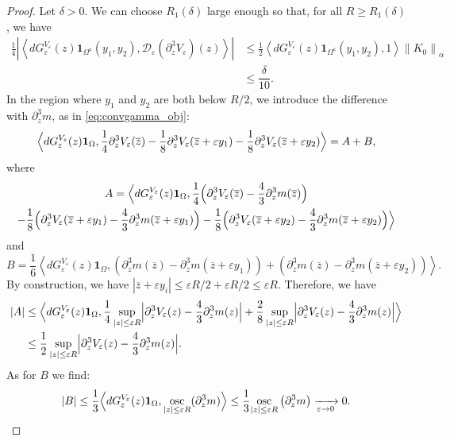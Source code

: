 \documentclass[10pt]{amsart}
\let\mathcal\mathscr
\theoremstyle{plain}
\theoremstyle{definition}
\newcommand{\comega}{\Omega^{\mathsf{c}}}
\newcommand{\D}{\mathcal{D}_\eps}
\let\eps\varepsilon
\newcommand{\abs}[1]{\left\lvert#1\right\rvert}
\newcommand{\Babs}[1]{\Bigl\lvert#1\Bigr\rvert}
\newcommand{\nalph}[1]{\left\lVert#1\right\rVert_\alpha}
\newcommand{\dQVe}{dG_\eps^{V_\eps}}
\newcommand{\bz}{\overline{z}}
\begin{document}
\begin{proof}
Let $\delta>0$. We can choose $R_1(\delta)$ large enough so that, for all $R\geq R_1(\delta)$, we have
\begin{equation*}
\begin{split}
\frac14 \left |\left\langle \dQVe(z)\mathbf{1}_{\comega}(y_1,y_2), \D(\partial_z^3 V_\eps)(z) \right\rangle \right |
&\leq \frac12 \left\langle \dQVe(z)\mathbf{1}_{\comega}(y_1,y_2), 1 \right\rangle \nalph{K_0}\\
& \leq \dfrac{\delta}{10}.
\end{split}
\end{equation*}
In the region where $y_1$ and $y_2$ are both below $R/2$,
we introduce the difference with $\partial_z^3m$, as in \eqref{eq:convgamma_obj}:
\begin{equation*}
\Bigl\langle \dQVe(z) \mathbf{1}_{\Omega}, \dfrac{1}{4} \partial_z^3 V_\eps(\bz) -\dfrac{1}{8} \partial^3_z V_\eps(\bz+\eps y_1)-\dfrac{1}{8} \partial^3_z V_\eps(\bz+\eps y_2) \Bigr\rangle = A + B,
\end{equation*}
where
\begin{multline*}
A = \Bigl\langle \dQVe(z)\mathbf{1}_{\Omega}, \dfrac{1}{4} \Bigl(\partial_z^3 V_\eps(\bz)-\frac43 \partial_z^3 m(\bz) \Bigr) \\
-\dfrac{1}{8} \Bigl(\partial^3_z V_\eps(\bz+\eps y_1)-\frac43 \partial_z^3 m(\bz + \eps y_1) \Bigr)-\dfrac{1}{8} \Bigl(\partial^3_z V_\eps(\bz+\eps y_2) -\frac43 \partial_z^3 m(\bz +\eps y_2) \Bigr) \Bigr\rangle
\end{multline*}
and
\begin{equation*}
B = \frac16 \left\langle \dQVe(z)\mathbf{1}_{\Omega}, \left (\partial^3_z m(\bz) - \partial_z^3 m(\bz + \eps y_1)\right) +\left (\partial^3_z m(\bz) - \partial_z^3 m(\bz +\eps y_2) \right)\right\rangle.
\end{equation*}
By construction, we have $|\bz + \eps y_i| \leq \eps R/2 + \eps R/2 \leq \eps R$. Therefore, we have
\begin{align*}
\abs{A} & \leq \Bigl\langle \dQVe(z) \mathbf{1}_{\Omega}, \dfrac{1}{4} \sup_{\abs{z} \leq \eps R}\Babs{ \partial_z^3 V_\eps(z)- \frac43 \partial_z^3 m(z)} + \dfrac{2}{8} \sup_{\abs{z} \leq \eps R} \Babs{ \partial_z^3 V_\eps(z)- \frac43 \partial_z^3 m(z)} \Bigr\rangle \\
& \leq \dfrac{1}{2}\sup_{\abs{z} \leq \eps R} \Babs{ \partial_z^3 V_\eps(z)- \frac43 \partial_z^3 m(z)}.
\end{align*}
As for $B$ we find:
\begin{equation*}
\abs{B} \leq \dfrac13 \Bigl\langle \dQVe(z) \mathbf{1}_{\Omega}, \underset{\abs{z} \leq \eps R} { \text{ osc }}(\partial_z^3 m) \Bigr\rangle \leq \dfrac13 \underset{\abs{z} \leq \eps R} { \text{ osc }}\left (\partial_z^3 m\right) \xrightarrow[\eps \to 0]{} 0.

\end{equation*}
\end{proof}
\end{document}
